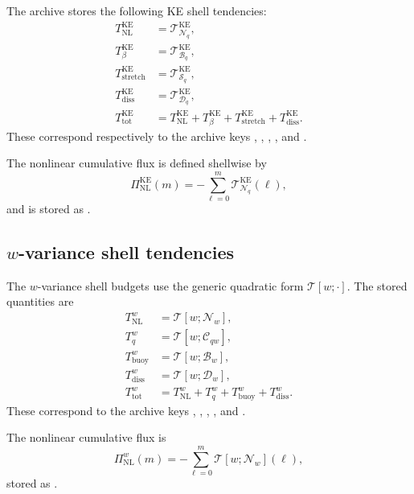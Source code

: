 \documentclass[11pt]{article}
\begin{document}
The archive stores the following KE shell tendencies:
\begin{align*}
T^{\mathrm{KE}}_{\mathrm{NL}} &= \mathcal{T}^{\mathrm{KE}}_{\mathcal{N}_q},\\
T^{\mathrm{KE}}_{\beta} &= \mathcal{T}^{\mathrm{KE}}_{\mathcal{B}_q},\\
T^{\mathrm{KE}}_{\mathrm{stretch}} &= \mathcal{T}^{\mathrm{KE}}_{\mathcal{S}_q},\\
T^{\mathrm{KE}}_{\mathrm{diss}} &= \mathcal{T}^{\mathrm{KE}}_{\mathcal{D}_q},\\
T^{\mathrm{KE}}_{\mathrm{tot}} &=
T^{\mathrm{KE}}_{\mathrm{NL}}
+ T^{\mathrm{KE}}_{\beta}
+ T^{\mathrm{KE}}_{\mathrm{stretch}}
+ T^{\mathrm{KE}}_{\mathrm{diss}}.
\end{align*}
These correspond respectively to the archive keys
,
,
,
, and
.

The nonlinear cumulative flux is defined shellwise by
\[
\Pi^{\mathrm{KE}}_{\mathrm{NL}}(m)
=
-\sum_{\ell=0}^{m}
\mathcal{T}^{\mathrm{KE}}_{\mathcal{N}_q}(\ell),
\]
and is stored as .

\subsection{\(w\)-variance shell tendencies}

The \(w\)-variance shell budgets use the generic quadratic form
\(\mathcal{T}[w; \cdot]\). The stored quantities are
\begin{align*}
T^{w}_{\mathrm{NL}} &= \mathcal{T}[w;\mathcal{N}_w],\\
T^{w}_{q} &= \mathcal{T}[w;\mathcal{C}_{qw}],\\
T^{w}_{\mathrm{buoy}} &= \mathcal{T}[w;\mathcal{B}_w],\\
T^{w}_{\mathrm{diss}} &= \mathcal{T}[w;\mathcal{D}_w],\\
T^{w}_{\mathrm{tot}} &= T^{w}_{\mathrm{NL}} + T^{w}_{q}
+ T^{w}_{\mathrm{buoy}} + T^{w}_{\mathrm{diss}}.
\end{align*}
These correspond to the archive keys
,
,
,
, and
.

The nonlinear cumulative flux is
\[
\Pi^{w}_{\mathrm{NL}}(m)
=
-\sum_{\ell=0}^{m}
\mathcal{T}[w;\mathcal{N}_w](\ell),
\]
stored as .
\end{document}
